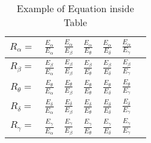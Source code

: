 \begin{table}[ht]
    
    \centering
    \renewcommand{\arraystretch}{2}
    \begin{tabular}{|c|c|c|c|c|c|c|}
      \hline
      $R_{\alpha} =$ & \hspace{0.5cm}$\frac{E_{\alpha}}{E_\alpha}$\hspace{0.5cm} & \hspace{0.5cm}$\frac{E_{\alpha}}{E_\beta}$\hspace{0.5cm} & \hspace{0.5cm}$\frac{E_{\alpha}}{E_\theta}$\hspace{0.5cm} & \hspace{0.5cm}$\frac{E_{\alpha}}{E_\delta}$\hspace{0.5cm} & \hspace{0.5cm}$\frac{E_{\alpha}}{E_\gamma}$\hspace{0.5cm} \\ \hline
      $R_{\beta} =$  & $\frac{E_{\beta}}{E_\alpha}$  & $\frac{E_{\beta}}{E_\beta}$  & $\frac{E_{\beta}}{E_\theta}$  & $\frac{E_{\beta}}{E_\delta}$  & $\frac{E_{\beta}}{E_\gamma}$  \\ \hline
      $R_{\theta} =$ & $\frac{E_{\theta}}{E_\alpha}$ & $\frac{E_{\theta}}{E_\beta}$ & $\frac{E_{\theta}}{E_\theta}$ & $\frac{E_{\theta}}{E_\delta}$ & $\frac{E_{\theta}}{E_\gamma}$ \\ \hline
      $R_{\delta} =$ & $\frac{E_{\delta}}{E_\alpha}$ & $\frac{E_{\delta}}{E_\beta}$ & $\frac{E_{\delta}}{E_\theta}$ & $\frac{E_{\delta}}{E_\delta}$ & $\frac{E_{\delta}}{E_\gamma}$ \\ \hline
      $R_{\gamma} =$ & $\frac{E_{\gamma}}{E_\alpha}$ & $\frac{E_{\gamma}}{E_\beta}$ & $\frac{E_{\gamma}}{E_\theta}$ & $\frac{E_{\gamma}}{E_\delta}$ & $\frac{E_{\gamma}}{E_\gamma}$ \\ \hline      
    \end{tabular}
    \caption{Example of Equation inside Table}
    \end{table}

